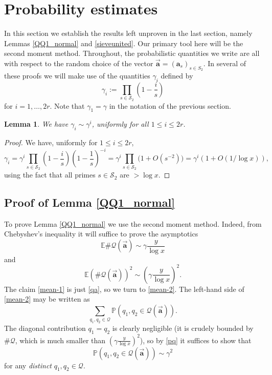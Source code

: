 \documentclass[12pt]{amsart}
\numberwithin{equation}{section}  %
\theoremstyle{remark}
\theoremstyle{plain}
\newtheorem{lem}{Lemma}[section]
\numberwithin{equation}{section}
\newcommand{\E}{\mathbb{E}}  %
\newcommand{\PR}{\mathbb{P}}  %
\newcommand{\g}{\gamma}
\renewcommand{\leq}{\leqslant}
\renewcommand{\(}{\left(}
\renewcommand{\)}{\right)}
\newcommand{\asym}{\sim}   %
\newcommand{\vect}[1]{{\ensuremath{\vec{#1}}}}
\newcommand{\QQ}{\mathcal{Q}}
\newcommand{\cS}{\mathcal{S}}
\begin{document}
%
\section{Probability estimates}\label{sec:prob}
%

In this section we establish the results left unproven in the last
section, namely Lemmas \ref{QQ1_normal} and \ref{sieveunited}.  Our primary tool here will be the second moment method.  Throughout, 
the probabilistic quantities we write are
all with respect to the random choice of the vector
$\vect{\mathbf{a}}=(\mathbf{a}_s)_{s\in S_2}$.
In several of these proofs we will make use of the quantities $\gamma_i$ defined by
\begin{equation}\label{gammai-def}
\gamma_i:=\prod_{s\in \cS_2} \left(1-\frac is\right)
\end{equation}
for $i = 1,\dots, 2r$. Note that $\gamma_1 = \gamma$ in the notation of the previous section.

\begin{lem}\label{gam-bounds}
We have $\gamma_i \asym \gamma^i$, uniformly for all $1 \leq i \leq 2r$.

\end{lem}
\begin{proof} We have, uniformly for $1 \leq i \leq 2r$,
\[
\gamma_i=\gamma^{i}\prod_{s\in \cS_2} \left(1-\frac is\right)
\left(1-\frac 1s\right)^{-i}
=\g^i\prod_{s\in \cS_2}\big(1+O(s^{-2})\big)
=\g^i(1+O(1/\log x)),
\]
using the fact that all primes $s \in \cS_2$ are $> \log x$.
\end{proof}

\subsection{Proof of Lemma \ref{QQ1_normal}}

To prove Lemma \ref{QQ1_normal} we use the second moment method.  Indeed, from Chebyshev's inequality it will suffice to prove the asymptotics
\begin{equation}\label{mean-1}
\E \# \QQ(\vect{\mathbf{a}}) \asym \gamma \frac{y}{\log x}
\end{equation}
and
\begin{equation}\label{mean-2}
\E (\# \QQ(\vect{\mathbf{a}}))^2 \asym \left(\gamma \frac{y}{\log x}\right)^2.
\end{equation}
The claim \eqref{mean-1} is just \eqref{qa}, so we turn to \eqref{mean-2}. 
The left-hand side of \eqref{mean-2} may be written as
$$  \sum_{q_1, q_2 \in \QQ} \PR( q_1,q_2 \in \QQ(\vect{\mathbf{a}}) ).$$
The diagonal contribution $q_1=q_2$ is clearly negligible (it is crudely bounded by $\# \QQ$, which is much smaller than $\left(\gamma \frac{y}{\log x}\right)^2$), so by \eqref{pq} it suffices to show that
$$ \PR( q_1,q_2 \in \QQ(\vect{\mathbf{a}}) ) \asym \gamma^2$$
for any \emph{distinct} $q_1, q_2 \in \QQ$.
\end{document}
